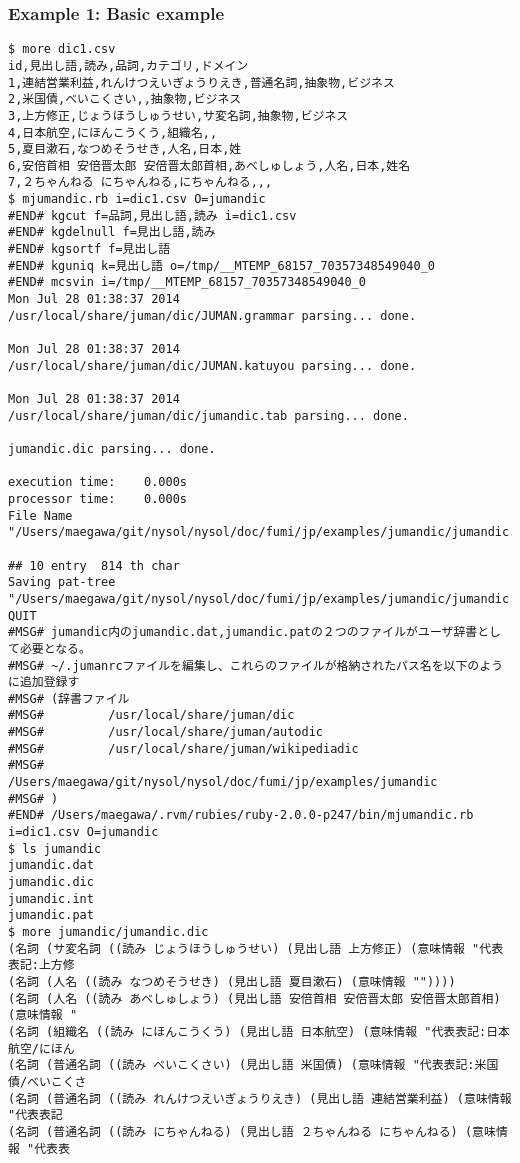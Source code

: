 \subsubsection*{Example 1: Basic example} 



\begin{Verbatim}[baselinestretch=0.7,frame=single]
$ more dic1.csv
id,見出し語,読み,品詞,カテゴリ,ドメイン
1,連結営業利益,れんけつえいぎょうりえき,普通名詞,抽象物,ビジネス
2,米国債,べいこくさい,,抽象物,ビジネス
3,上方修正,じょうほうしゅうせい,サ変名詞,抽象物,ビジネス
4,日本航空,にほんこうくう,組織名,,
5,夏目漱石,なつめそうせき,人名,日本,姓
6,安倍首相 安倍晋太郎 安倍晋太郎首相,あべしゅしょう,人名,日本,姓名
7,２ちゃんねる にちゃんねる,にちゃんねる,,,
$ mjumandic.rb i=dic1.csv O=jumandic
#END# kgcut f=品詞,見出し語,読み i=dic1.csv
#END# kgdelnull f=見出し語,読み
#END# kgsortf f=見出し語
#END# kguniq k=見出し語 o=/tmp/__MTEMP_68157_70357348549040_0
#END# mcsvin i=/tmp/__MTEMP_68157_70357348549040_0
Mon Jul 28 01:38:37 2014
/usr/local/share/juman/dic/JUMAN.grammar parsing... done.

Mon Jul 28 01:38:37 2014
/usr/local/share/juman/dic/JUMAN.katuyou parsing... done.

Mon Jul 28 01:38:37 2014
/usr/local/share/juman/dic/jumandic.tab parsing... done.

jumandic.dic parsing... done.

execution time:    0.000s
processor time:    0.000s
File Name "/Users/maegawa/git/nysol/nysol/doc/fumi/jp/examples/jumandic/jumandic.dat"

## 10 entry  814 th char
Saving pat-tree "/Users/maegawa/git/nysol/nysol/doc/fumi/jp/examples/jumandic/jumandic.pat" 
QUIT
#MSG# jumandic内のjumandic.dat,jumandic.patの２つのファイルがユーザ辞書として必要となる。
#MSG# ~/.jumanrcファイルを編集し、これらのファイルが格納されたパス名を以下のように追加登録す
#MSG# (辞書ファイル
#MSG#         /usr/local/share/juman/dic
#MSG#         /usr/local/share/juman/autodic
#MSG#         /usr/local/share/juman/wikipediadic
#MSG#         /Users/maegawa/git/nysol/nysol/doc/fumi/jp/examples/jumandic
#MSG# )
#END# /Users/maegawa/.rvm/rubies/ruby-2.0.0-p247/bin/mjumandic.rb i=dic1.csv O=jumandic
$ ls jumandic
jumandic.dat
jumandic.dic
jumandic.int
jumandic.pat
$ more jumandic/jumandic.dic
(名詞 (サ変名詞 ((読み じょうほうしゅうせい) (見出し語 上方修正) (意味情報 "代表表記:上方修
(名詞 (人名 ((読み なつめそうせき) (見出し語 夏目漱石) (意味情報 ""))))
(名詞 (人名 ((読み あべしゅしょう) (見出し語 安倍首相 安倍晋太郎 安倍晋太郎首相) (意味情報 "
(名詞 (組織名 ((読み にほんこうくう) (見出し語 日本航空) (意味情報 "代表表記:日本航空/にほん
(名詞 (普通名詞 ((読み べいこくさい) (見出し語 米国債) (意味情報 "代表表記:米国債/べいこくさ
(名詞 (普通名詞 ((読み れんけつえいぎょうりえき) (見出し語 連結営業利益) (意味情報 "代表表記
(名詞 (普通名詞 ((読み にちゃんねる) (見出し語 ２ちゃんねる にちゃんねる) (意味情報 "代表表
\end{Verbatim}
